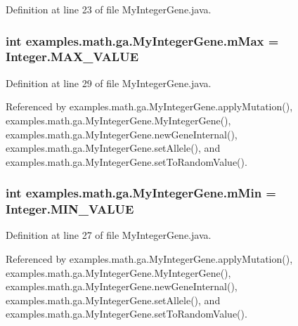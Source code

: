 Definition at line 23 of file My\-Integer\-Gene.\-java.

\hypertarget{classexamples_1_1math_1_1ga_1_1_my_integer_gene_a887b95f2e9f1456203da59b931addf4e}{
\subsubsection[{m\-Max}]{\setlength{\rightskip}{0pt plus 5cm}int examples.\-math.\-ga.\-My\-Integer\-Gene.\-m\-Max = Integer.\-M\-A\-X\-\_\-\-V\-A\-L\-U\-E\hspace{0.3cm}{\ttfamily [private]}}}\label{classexamples_1_1math_1_1ga_1_1_my_integer_gene_a887b95f2e9f1456203da59b931addf4e}


Definition at line 29 of file My\-Integer\-Gene.\-java.



Referenced by examples.\-math.\-ga.\-My\-Integer\-Gene.\-apply\-Mutation(), examples.\-math.\-ga.\-My\-Integer\-Gene.\-My\-Integer\-Gene(), examples.\-math.\-ga.\-My\-Integer\-Gene.\-new\-Gene\-Internal(), examples.\-math.\-ga.\-My\-Integer\-Gene.\-set\-Allele(), and examples.\-math.\-ga.\-My\-Integer\-Gene.\-set\-To\-Random\-Value().

\hypertarget{classexamples_1_1math_1_1ga_1_1_my_integer_gene_a1755fecb014bc107e32a40b8ecea8e8f}{
\subsubsection[{m\-Min}]{\setlength{\rightskip}{0pt plus 5cm}int examples.\-math.\-ga.\-My\-Integer\-Gene.\-m\-Min = Integer.\-M\-I\-N\-\_\-\-V\-A\-L\-U\-E\hspace{0.3cm}{\ttfamily [private]}}}\label{classexamples_1_1math_1_1ga_1_1_my_integer_gene_a1755fecb014bc107e32a40b8ecea8e8f}


Definition at line 27 of file My\-Integer\-Gene.\-java.



Referenced by examples.\-math.\-ga.\-My\-Integer\-Gene.\-apply\-Mutation(), examples.\-math.\-ga.\-My\-Integer\-Gene.\-My\-Integer\-Gene(), examples.\-math.\-ga.\-My\-Integer\-Gene.\-new\-Gene\-Internal(), examples.\-math.\-ga.\-My\-Integer\-Gene.\-set\-Allele(), and examples.\-math.\-ga.\-My\-Integer\-Gene.\-set\-To\-Random\-Value().

